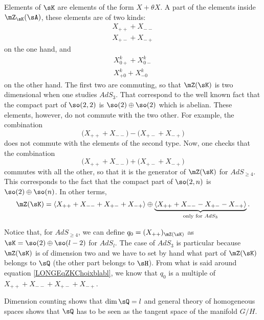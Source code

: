 Elements of $\sK$ are elements of the form $X+\theta X$. A part of the elements inside $\mZ_{\sK}(\sA)$, these elements are of two kinds:
\begin{subequations}
	\begin{align}
		X_{++}+X_{--}\\
		X_{+-}+X_{-+}
	\end{align}
\end{subequations}
on the one hand, and
\begin{subequations}
	\begin{align}
		X^k_{0+}+X^k_{0-}\\
		X^k_{+0}+X^k_{-0}
	\end{align}
\end{subequations}
on the other hand. The first two are commuting, so that $\mZ(\sK)$ is two dimensional when one studies $AdS_3$. That correspond to the well known fact that the compact part of $\so(2,2)$ is $\so(2)\oplus\so(2)$ which is abelian. These elements, however, do not commute with the two other. For example, the combination
\begin{equation}
	\big( X_{++}+X_{--}\big)-\big(X_{+-}+X_{-+}\big)
\end{equation}
does not commute with the elements of the second type. Now, one checks that the combination
\begin{equation}		\label{LONGEqZKChoixblabl}
	\big( X_{++}+X_{--}\big)+\big( X_{+-}+X_{-+})
\end{equation}
commutes with all the other, so that it is the generator of $\mZ(\sK)$ for $AdS_{\geq 4}$. This corresponds to the fact that the compact part of $\so(2,n)$ is $\so(2)\oplus\so(n)$. In other terms,
\begin{equation}		\label{LONGEqDecompZKenDeuxSuivantDim}
	\mZ(\sK)=\langle X_{++}+X_{--}+X_{+-}+X_{-+}\rangle\oplus\underbrace{\langle X_{++}+X_{--}-X_{+-}-X_{-+}\rangle}_{\text{only for }AdS_3}.
\end{equation}


Notice that, for $AdS_{\geq 4}$, we can define $q_0=(X_{++})_{\mZ(\sK)}$ as $\sK=\so(2)\oplus\so(l-2)$ for $AdS_l$. The case of $AdS_3$ is particular because $\mZ(\sK)$ is of dimension two and we have to set by hand what part of $\mZ(\sK)$ belongs to $\sQ$ (the other part belongs to $\sH$). From what is said around equation \eqref{LONGEqZKChoixblabl}, we know that $q_0$ is a multiple of $X_{++}+X_{--}+X_{+-}+X_{-+}$.

Dimension counting shows that $\dim\sQ=l$ and general theory of homogeneous spaces shows that $\sQ$ has to be seen as the tangent space of the manifold $G/H$.

